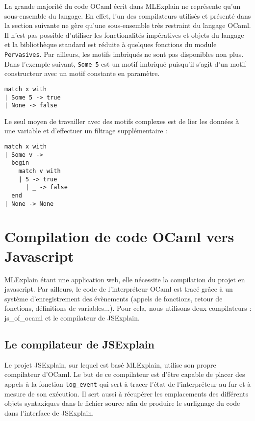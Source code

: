 \documentclass[a4paper,10pt]{report}
\begin{document}
La grande majorité du code OCaml écrit dans MLExplain ne représente qu'un 
sous-ensemble du langage. En effet, l'un des compilateurs utilisés et présenté 
dans la section suivante ne gère qu'une sous-ensemble très restraint du langage 
OCaml. Il n'est pas possible d'utiliser les fonctionalités impératives et 
objets du langage et la bibliothèque standard est réduite à quelques fonctions 
du module \verb|Pervasives|. Par ailleurs, les motifs imbriqués ne sont pas 
disponibles non plus. Dans l'exemple suivant, \verb|Some 5| est un motif 
imbriqué puisqu'il s'agit d'un motif constructeur avec un motif constante en 
paramètre.

\begin{verbatim}
match x with
| Some 5 -> true
| None -> false
\end{verbatim}

Le seul moyen de travailler avec des motifs complexes est de lier les données à 
une variable et d'effectuer un filtrage supplémentaire :

\begin{verbatim}
match x with
| Some v ->
  begin
    match v with
    | 5 -> true
      | _ -> false
  end
| None -> None
\end{verbatim}


\section{Compilation de code OCaml vers Javascript}
MLExplain étant une application web, elle nécessite la compilation du projet en 
javascript. Par ailleurs, le code de l'interpréteur OCaml est tracé grâce à un 
système d'enregistrement des évènements (appels de fonctions, retour de 
fonctions, définitions de variables...). Pour cela, nous utilisons deux 
compilateurs : js\_of\_ocaml et le compilateur de JSExplain.

\subsection{Le compilateur de JSExplain}
Le projet JSExplain, sur lequel est basé MLExplain, utilise son propre 
compilateur d'OCaml. Le but de ce compilateur est d'être capable de placer des 
appels à la fonction \verb|log_event| qui sert à tracer l'état de l'interpréteur 
au fur et à mesure de son exécution. Il sert aussi à récupérer les emplacements 
des différents objets syntaxiques dans le fichier source afin de produire le 
surlignage du code dans l'interface de JSExplain.
\end{document}
